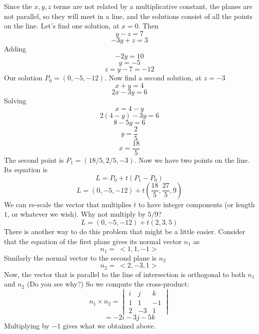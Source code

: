 \documentclass[11pt, oneside]{article}
\begin{document}
Since the $x,y,z$ terms are not related by a multiplicative constant, the planes are not parallel, so they will meet in a line, and the solutions consist of all the points on the line.  Let's find one solution, at $x=0$.  Then
\[ y - z = 7 \]
\[-3y + z = 3 \]
Adding
\[-2y = 10 \]
\[y = -5 \]
\[z = y - 7 = -12 \]
Our solution $P_0=(0,-5,-12)$.
Now find a second solution, at $z = -3$
\[ x + y = 4 \]
\[ 2x - 3y = 6 \]
Solving
\[ x = 4 - y \]
\[ 2(4-y) -3y = 6 \]
\[ 8 - 5y = 6 \]
\[ y = \frac{2}{5} \]
\[ x = \frac{18}{5} \]
The second point is $P_1 = (18/5, 2/5, -3)$.
Now we have two points on the line.  Its equation is 
\[ L = P_0 + t(P_1 - P_0) \]
\[ L = (0,-5,-12) + t(\frac{18}{5}, \frac{27}{5}, 9)\]
We can re-scale the vector that multiplies $t$ to have integer components (or length $1$, or whatever we wish).  Why not multiply by $5/9$?
\[ L = (0,-5,-12) + t(2, 3, 5)\]
There is another way to do this problem that might be a little easier.  Consider that the equation of the first plane gives its normal vector $n_1$ as
\[ n_1 =\ <1,1,-1> \]
Similarly the normal vector to the second plane is $n_2$
\[ n_2 =\ <2,-3,1> \]
Now, the vector that is parallel to the line of intersection is orthogonal to both $n_1$ and $n_2$  (Do you see why?)  So we compute the cross-product:
\[ n_1 \times n_2 = 
\begin{vmatrix} 
  i  &  j  &  k \\ 
  1  &  1 & -1 \\
  2  &  -3 & 1
\end{vmatrix}
\]
\[ = -2i -3j -5k \]
Multiplying by $-1$ gives what we obtained above.
\end{document}

